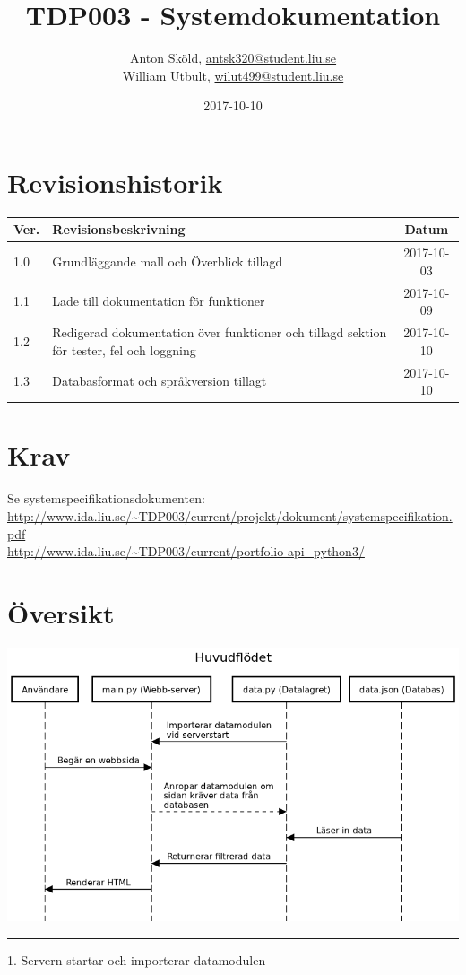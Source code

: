\documentclass{TDP003mall}
\author{Anton Sköld, \href{mailto:antsk320@student.liu.se}{antsk320@student.liu.se}\\
  William Utbult, \href{mailto:wilut499@student.liu.se}{wilut499@student.liu.se}}
\title{TDP003 - Systemdokumentation}
\date{2017-10-10}
\begin{document}
\projectpage
\tableofcontents

\section{Revisionshistorik}
\begin{table}[!h]
\begin{tabularx}{\linewidth}{|l|X|c|}
\hline
Ver. & Revisionsbeskrivning & Datum \\\hline
1.0 & Grundläggande mall och Överblick tillagd & 2017-10-03\\\hline
1.1 & Lade till dokumentation för funktioner & 2017-10-09\\\hline
1.2 & Redigerad dokumentation över funktioner och tillagd sektion för tester, fel och loggning & 2017-10-10\\\hline
1.3 & Databasformat och språkversion tillagt & 2017-10-10\\\hline
\end{tabularx}
\end{table}


\section{Krav}
Se systemspecifikationsdokumenten:\\
\url{http://www.ida.liu.se/~TDP003/current/projekt/dokument/systemspecifikation.pdf} \\
\url{http://www.ida.liu.se/~TDP003/current/portfolio-api_python3/}


\section{Översikt}
\includegraphics[width=17cm]{sequencediagram.org/mainflow2}
\hrule
1. Servern startar och importerar datamodulen
\end{document}
